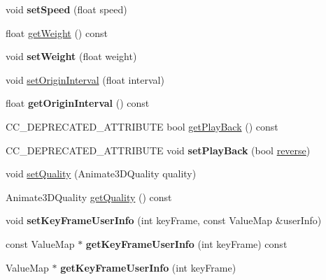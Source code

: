 \begin{DoxyCompactItemize}
\item 
\mbox{\label{classAnimate3D_ad731fd7945fe60d58052e6d5aa14a675}} 
void {\bfseries set\+Speed} (float speed)
\item 
float \hyperlink{classAnimate3D_ac221fedd9e89cf60aa2a9ba6b7fabea8}{get\+Weight} () const
\item 
\mbox{\label{classAnimate3D_ac84a327ea6852e0b6ba757ec1cdaaa50}} 
void {\bfseries set\+Weight} (float weight)
\item 
void \hyperlink{classAnimate3D_a1b01bd49f7aaa50586f21d41137555c2}{set\+Origin\+Interval} (float interval)
\item 
\mbox{\label{classAnimate3D_a428a507dd96210b1399ed1de8f096d29}} 
float {\bfseries get\+Origin\+Interval} () const
\item 
C\+C\+\_\+\+D\+E\+P\+R\+E\+C\+A\+T\+E\+D\+\_\+\+A\+T\+T\+R\+I\+B\+U\+TE bool \hyperlink{classAnimate3D_ac9ca6671172132e1e29ceeb810df4ba4}{get\+Play\+Back} () const
\item 
\mbox{\label{classAnimate3D_ae71e30a9bea943566d828ddfd9e700e8}} 
C\+C\+\_\+\+D\+E\+P\+R\+E\+C\+A\+T\+E\+D\+\_\+\+A\+T\+T\+R\+I\+B\+U\+TE void {\bfseries set\+Play\+Back} (bool \hyperlink{classAnimate3D_aa8acc0668132f57fee370bfdbea308cb}{reverse})
\item 
void \hyperlink{classAnimate3D_a0dd43ee90872c19d04c87904fceb99a6}{set\+Quality} (Animate3\+D\+Quality quality)
\item 
Animate3\+D\+Quality \hyperlink{classAnimate3D_af9e4be0cb5896579154c7dd971315914}{get\+Quality} () const
\item 
\mbox{\label{classAnimate3D_a92074f1cf279429fa72051702f14e59c}} 
void {\bfseries set\+Key\+Frame\+User\+Info} (int key\+Frame, const Value\+Map \&user\+Info)
\item 
\mbox{\label{classAnimate3D_a9fb4da88f55ba61386ba3d5766be32ea}} 
const Value\+Map $\ast$ {\bfseries get\+Key\+Frame\+User\+Info} (int key\+Frame) const
\item 
\mbox{\label{classAnimate3D_a884c5d512689d482cea873a5936bd736}} 
Value\+Map $\ast$ {\bfseries get\+Key\+Frame\+User\+Info} (int key\+Frame)

\end{DoxyCompactItemize}
